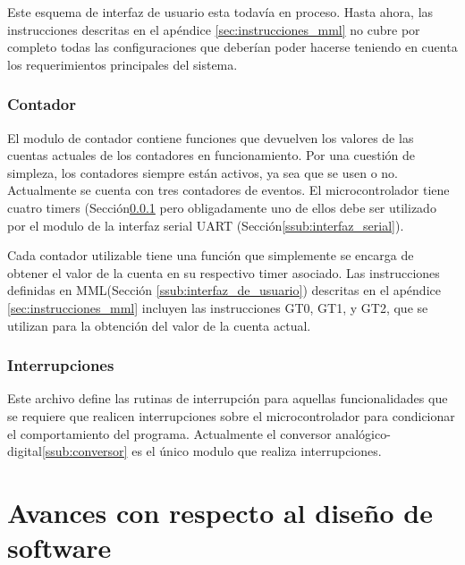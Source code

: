 \documentclass{article}
\theoremstyle{definition}
\theoremstyle{remark}
\begin{document}
Este esquema de interfaz de usuario esta todavía en proceso. Hasta ahora, las instrucciones descritas en el apéndice \ref{sec:instrucciones_mml} no cubre por completo todas las configuraciones que deberían poder hacerse teniendo en cuenta los requerimientos principales del sistema.


\subsubsection{Contador} %
\label{ssub:contador}

El modulo de contador contiene funciones que devuelven los valores de las cuentas actuales de los contadores en funcionamiento. Por una cuestión de simpleza, los contadores siempre están activos, ya sea que se usen o no. Actualmente se cuenta con tres contadores de eventos. El microcontrolador tiene cuatro timers (Secci\'on\ref{ssub:contador} pero obligadamente uno de ellos debe ser utilizado por el modulo de la interfaz serial UART (Secci\'on\ref{ssub:interfaz_serial}).

Cada contador utilizable tiene una función que simplemente se encarga de obtener el valor de la cuenta en su respectivo timer asociado. Las instrucciones definidas en MML(Sección \ref{ssub:interfaz_de_usuario}) descritas en el apéndice \ref{sec:instrucciones_mml} incluyen las instrucciones GT0, GT1, y GT2, que se utilizan para la obtención del valor de la cuenta actual.



\subsubsection{Interrupciones} %
\label{ssub:interrupciones}

Este archivo define las rutinas de interrupción para aquellas funcionalidades que se requiere que realicen interrupciones sobre el microcontrolador para condicionar el comportamiento del programa. Actualmente el conversor analógico-digital\ref{ssub:conversor} es el único modulo que realiza interrupciones.




\section{Avances con respecto al diseño de software} %
\label{sec:avances_con_respecto_al_diseno_de_software}
\end{document}
